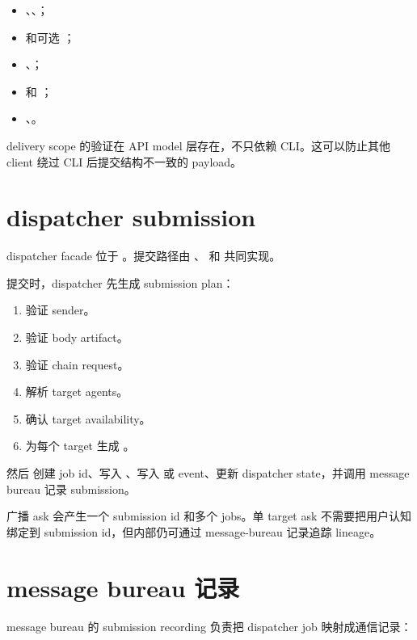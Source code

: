 \begin{itemize}
  \item {}、、；
  \item {} 和可选 ；
  \item {}、；
  \item {} 和 ；
  \item {}、。
\end{itemize}

delivery scope 的验证在 API model 层存在，不只依赖 CLI。这可以防止其他 client 绕过 CLI 后提交结构不一致的 payload。

\section{dispatcher submission}

dispatcher facade 位于 。提交路径由 、 和  共同实现。

提交时，dispatcher 先生成 submission plan：

\begin{enumerate}
  \item 验证 sender。
  \item 验证 body artifact。
  \item 验证 chain request。
  \item 解析 target agents。
  \item 确认 target availability。
  \item 为每个 target 生成 。
\end{enumerate}

然后  创建 job id、写入 、写入  或  event、更新 dispatcher state，并调用 message bureau 记录 submission。

广播 ask 会产生一个 submission id 和多个 jobs。单 target ask 不需要把用户认知绑定到 submission id，但内部仍可通过 message-bureau 记录追踪 lineage。

\section{message bureau 记录}

message bureau 的 submission recording 负责把 dispatcher job 映射成通信记录：

